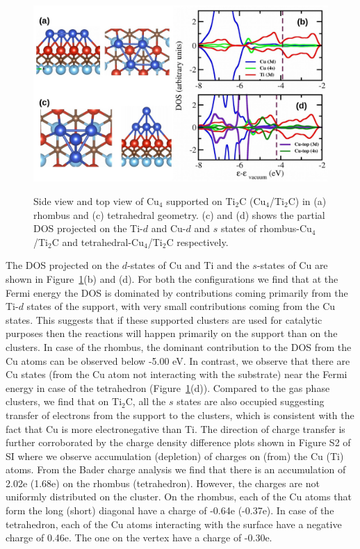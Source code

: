 \begin{figure}[ht]
 \begin{center}
    \includegraphics[width=12cm]{./Appendix2/Appendix2_figures/cu_ti2c.jpg} \\[0cm]
 \end{center}
 \caption{Side view and top view of Cu$_4$ supported on Ti$_2$C (Cu$_4$/Ti$_2$C) in (a) rhombus and (c) tetrahedral geometry. (c) and (d) shows the partial DOS projected on the
 Ti-$d$ and Cu-$d$ and $s$ states of rhombus-Cu$_4$/Ti$_2$C and tetrahedral-Cu$_4$/Ti$_2$C
 respectively.}
  \label{cu_ti2c}
\end{figure}


The DOS projected on the $d$-states of Cu and Ti and the $s$-states of Cu are shown in 
Figure~\ref{cu_ti2c}(b) and (d).
For both the configurations we find that at the Fermi energy the DOS is dominated
by contributions coming primarily from the Ti-$d$ states of the support, with very
small contributions coming from the Cu states. This suggests that if these supported clusters are used for catalytic 
purposes then the reactions will happen primarily on the support than on the clusters.
In case of the rhombus, the dominant contribution to the DOS from the Cu atoms can be observed 
below -5.00 eV. 
In contrast, we observe that there are Cu states (from the Cu atom not interacting
with the substrate) near the Fermi energy in case of the tetrahedron (Figure~\ref{cu_ti2c}(d)). Compared to the gas phase clusters, we find
that on Ti$_2$C, all the $s$ states are also occupied suggesting transfer 
of electrons from the support to the clusters, which is consistent with the fact that Cu
is more electronegative than Ti. The direction of charge transfer is further 
corroborated by the charge density difference plots shown in Figure S2 of SI where we observe accumulation (depletion) of charges on (from) the Cu (Ti) atoms. From the Bader charge analysis we find that there is an accumulation of 2.02e (1.68e) on the rhombus (tetrahedron).
However, the charges are not uniformly distributed on the cluster. On the rhombus, each of
the Cu atoms that form the long (short) diagonal have a charge of -0.64e (-0.37e).
In case of the tetrahedron, each of the Cu atoms interacting with the surface have a
negative charge of 0.46e. The one on the vertex have a charge of -0.30e.

